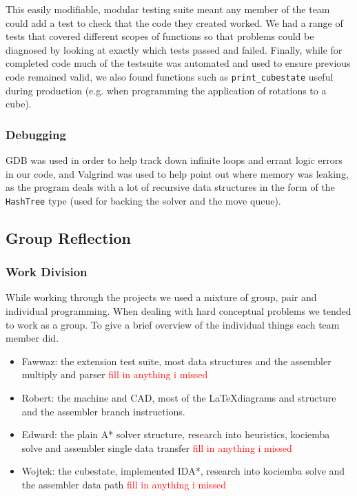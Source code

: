 \documentclass[8pt]{article}
\begin{document}
This easily modifiable, modular testing suite meant any member of the team could add a test to check that the code they created worked.
We had a range of tests that covered different scopes of functions so that problems could be diagnosed by looking at exactly which tests passed and failed.
Finally, while for completed code much of the testsuite was automated and used to ensure previous code remained valid, we also found functions such as 
\texttt{print\_cubestate} useful during production (e.g. when programming the application of rotations to a cube).

\subsubsection{Debugging}

GDB was used in order to help track down infinite loops and errant logic errors in our code, and Valgrind was used to help point out where memory was leaking, as the program deals with a lot of recursive data structures in the form of the \texttt{HashTree} type (used for backing the solver and the move queue).

\subsection{Group Reflection}

\subsubsection{Work Division}

While working through the projects we used a mixture of group, pair and individual
programming. When dealing with hard conceptual problems we tended to work as a 
group. To give a brief overview of the individual things each team member did.
\begin{itemize}
    \item Fawwaz: the extension test suite, most data structures and the assembler multiply and parser \textcolor{red}{fill in anything i missed}
    \item Robert: the machine and CAD, most of the \LaTeX \space diagrams and structure and
    the assembler branch instructions.
    \item Edward: the plain A* solver structure, research into heuristics, kociemba 
    solve and assembler single data transfer \textcolor{red}{fill in anything i missed}
    \item Wojtek: the cubestate, implemented IDA*, research into kociemba solve and the 
    assembler data path \textcolor{red}{fill in anything i missed}
\end{itemize}
\end{document}
